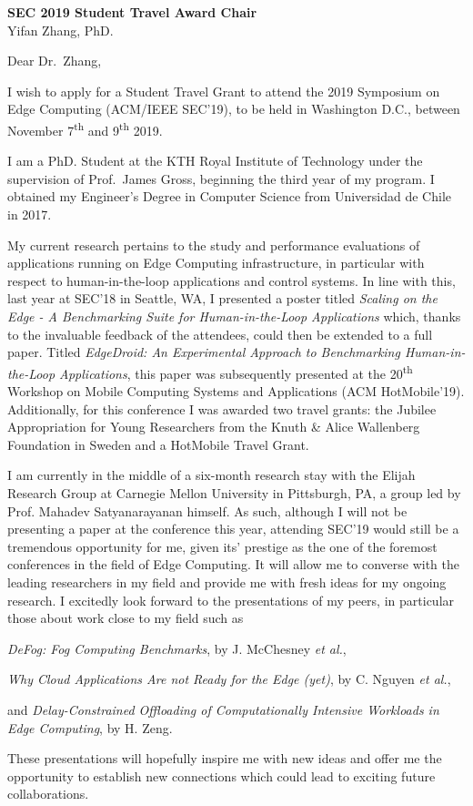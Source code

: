 \documentclass[english, 11pt]{kthletter}
\date{Stockholm, \today}
\begin{document}
\begin{letter}%
  {\textbf{SEC 2019 Student Travel Award Chair}\\Yifan Zhang, PhD.}
\opening{Dear Dr.~Zhang,}

I wish to apply for a Student Travel Grant to attend the 2019 Symposium on Edge Computing (ACM/IEEE SEC'19), to be held in Washington D.C., between November 7\textsuperscript{th} and 9\textsuperscript{th} 2019.

I am a PhD. Student at the KTH Royal Institute of Technology under the supervision of Prof.\ James Gross, beginning the third year of my program.
I obtained my Engineer's Degree in Computer Science from Universidad de Chile in 2017.

My current research pertains to the study and performance evaluations of applications running on Edge Computing infrastructure, in particular with respect to human-in-the-loop applications and control systems. In line with this, last year at SEC'18 in Seattle, WA, I presented a poster titled \emph{Scaling on the Edge - A Benchmarking Suite for Human-in-the-Loop Applications} which, thanks to the invaluable feedback of the attendees, could then be extended to a full paper. Titled \emph{EdgeDroid: An Experimental Approach to Benchmarking Human-in-the-Loop Applications}, this paper was subsequently presented at the 20\textsuperscript{th} Workshop on Mobile Computing Systems and Applications (ACM HotMobile'19). Additionally, for this conference I was awarded two travel grants: the Jubilee Appropriation for Young Researchers from the Knuth \& Alice Wallenberg Foundation in Sweden and a HotMobile Travel Grant. 

I am currently in the middle of a six-month research stay with the Elijah Research Group at Carnegie Mellon University in Pittsburgh, PA, a group led by Prof. Mahadev Satyanarayanan himself. As such, although I will not be presenting a paper at the conference this year, attending SEC'19 would still be a tremendous opportunity for me, given its' prestige as the one of the foremost conferences in the field of Edge Computing. It will allow me to converse with the leading researchers in my field and provide me with fresh ideas for my ongoing research. I excitedly look forward to the presentations of my peers, in particular those about work close to my field such as 
\begin{enumerate*}[label={(\arabic*)}]
    \item \emph{DeFog: Fog Computing Benchmarks}, by J. McChesney \emph{et al.},
    \item \emph{Why Cloud Applications Are not Ready for the Edge (yet)}, by C. Nguyen \emph{et al.},
    \item and \emph{Delay-Constrained Offloading of Computationally Intensive Workloads in Edge Computing}, by H. Zeng.
\end{enumerate*}
These presentations will hopefully inspire me with new ideas and offer me the opportunity to establish new connections which could lead to exciting future collaborations.


\end{letter}
\end{document}
